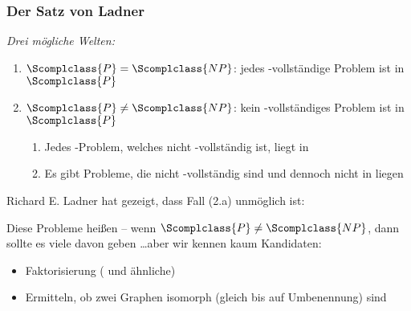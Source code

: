\documentclass[aspectratio=1610,onlymath]{beamer}
\begin{document}
\begin{frame}\frametitle{Der Satz von Ladner}

\emph{Drei mögliche Welten:}
\begin{enumerate}[(1)]
\item $\Scomplclass{P}=\Scomplclass{NP}$: jedes -vollständige Problem ist in $\Scomplclass{P}$
\item $\Scomplclass{P}\neq\Scomplclass{NP}$: kein -vollständiges Problem ist in $\Scomplclass{P}$
\begin{enumerate}[(2.a)]
\item Jedes -Problem, welches nicht -vollständig ist, liegt in 
\item Es gibt Probleme, die nicht -vollständig sind und dennoch nicht in  liegen
\end{enumerate}
\end{enumerate}\pause\bigskip

Richard E. Ladner hat gezeigt, dass Fall (2.a) unmöglich ist:


Diese Probleme heißen  \pause{} -- wenn $\Scomplclass{P}\neq\Scomplclass{NP}$, dann sollte es viele davon geben \ldots aber wir kennen kaum Kandidaten:
\begin{itemize}
\item Faktorisierung ( und ähnliche)
\item Ermitteln, ob zwei Graphen isomorph (gleich bis auf Umbenennung) sind
\end{itemize}


\end{frame}
\end{document}
